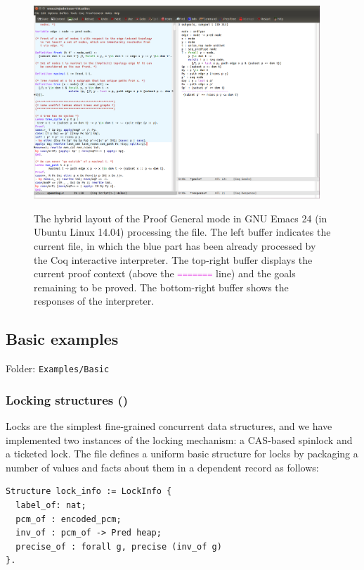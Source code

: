 \begin{figure}[t!]
\centering
%
{\includegraphics[width=0.96\textwidth]{pg-screen.png}}
%
\caption{The hybrid layout of the Proof General mode in GNU Emacs 24
  (in Ubuntu Linux 14.04) processing the  file. The
  left buffer indicates the current file, in which the blue part has
  been already processed by the Coq interactive interpreter. The
  top-right buffer displays the current proof context (above the
  \textcolor{violet}{\texttt{\small{=======}}} line) and the goals
  remaining to be proved. The bottom-right buffer shows the responses
  of the interpreter.}
\label{fig:pg}
\end{figure}

\subsection{Basic examples}
\label{sec:basic-examples}

Folder: \texttt{Examples/Basic}

\subsubsection{Locking structures ()}
\label{sec:locks}

Locks are the simplest fine-grained concurrent data structures, and we
have implemented two instances of the locking mechanism: a CAS-based
spinlock and a ticketed lock. The file  defines a
uniform basic structure for locks by packaging a number of values and
facts about them in a dependent record as follows:

\begin{lstlisting}
Structure lock_info := LockInfo {
  label_of: nat;
  pcm_of : encoded_pcm; 
  inv_of : pcm_of -> Pred heap; 
  precise_of : forall g, precise (inv_of g)
}.
\end{lstlisting}

